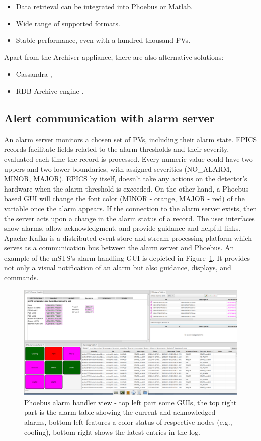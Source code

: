 \begin{itemize}
    \item Data retrieval can be integrated into Phoebus or Matlab.
    \item Wide range of supported formats.
    \item Stable performance, even with a hundred thousand \glspl{PV}.
\end{itemize}

Apart from the Archiver appliance, there are also alternative solutions:

\begin{itemize}
    \item Cassandra \cite{cassandra_archive},
    \item RDB Archive engine \cite{rdb_archive}.
\end{itemize}

\subsection{Alert communication with alarm server}
An alarm server monitors a chosen set of \glspl{PV}, including their alarm state. \gls{EPICS} records facilitate fields related to the alarm thresholds and their severity, evaluated each time the record is processed. Every numeric value could have two uppers and two lower boundaries, with assigned severities (NO\_ALARM, MINOR, MAJOR). \gls{EPICS} by itself, doesn't take any actions on the detector's hardware when the alarm threshold is exceeded. On the other hand, a Phoebus-based \gls{GUI} will change the font color (MINOR - orange, MAJOR - red) of the variable once the alarm appears. If the connection to the alarm server exists, then the server acts upon a change in the alarm status of a record. The user interfaces show alarms, allow acknowledgment, and provide guidance and helpful links. Apache Kafka is a distributed event store and stream-processing platform which serves as a communication bus between the alarm server and Phoebus. An example of the \gls{mSTS}'s alarm handling \gls{GUI} is depicted in Figure~\ref{fig_alarm1}. It provides not only a visual notification of an alarm but also guidance, displays, and commands.
\begin{figure}[!h]
\centering
\includegraphics[width=1\columnwidth]{Chapter4/images/alarms.png}
\caption{Phoebus alarm handler view -  top left part some \gls{GUI}s, the top right part is the alarm table showing the current and acknowledged alarms, bottom left features a color status of respective nodes (e.g., cooling), bottom right shows the latest entries in the log.}
\label{fig_alarm1}
\end{figure}
\newpage
